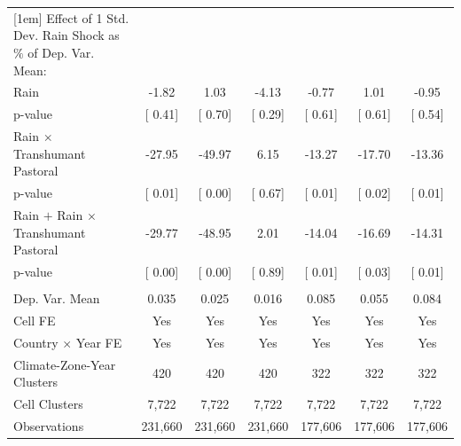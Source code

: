 {\begin{tabular}{l*{6}{c}}
[1em] Effect of 1 Std. Dev. Rain Shock as $\%$ of Dep. Var. Mean:&               &               &               &               &               &               \\
\hspace{15pt} Rain  & -1.82         &  1.03         & -4.13         & -0.77         &  1.01         & -0.95         \\
\hspace{15pt} p-value&[     0.41]         &[     0.70]         &[     0.29]         &[     0.61]         &[     0.61]         &[     0.54]         \\
[1em] \hspace{15pt} Rain $\times$ Transhumant Pastoral&-27.95         &-49.97         &  6.15         &-13.27         &-17.70         &-13.36         \\
\hspace{15pt} p-value&[     0.01]         &[     0.00]         &[     0.67]         &[     0.01]         &[     0.02]         &[     0.01]         \\
[1em]  \hspace{15pt} Rain $+$ Rain $\times$ Transhumant Pastoral&-29.77         &-48.95         &  2.01         &-14.04         &-16.69         &-14.31         \\
\hspace{15pt} p-value&[     0.00]         &[     0.00]         &[     0.89]         &[     0.01]         &[     0.03]         &[     0.01]         \\
\hline \\ Dep. Var. Mean& 0.035         & 0.025         & 0.016         & 0.085         & 0.055         & 0.084         \\
Cell FE             &   Yes         &   Yes         &   Yes         &   Yes         &   Yes         &   Yes         \\
Country $\times$ Year FE&   Yes         &   Yes         &   Yes         &   Yes         &   Yes         &   Yes         \\
Climate-Zone-Year Clusters&   420         &   420         &   420         &   322         &   322         &   322         \\
Cell Clusters       & 7,722         & 7,722         & 7,722         & 7,722         & 7,722         & 7,722         \\
Observations        &231,660         &231,660         &231,660         &177,606         &177,606         &177,606         \\
\bottomrule
\end{tabular}
}

